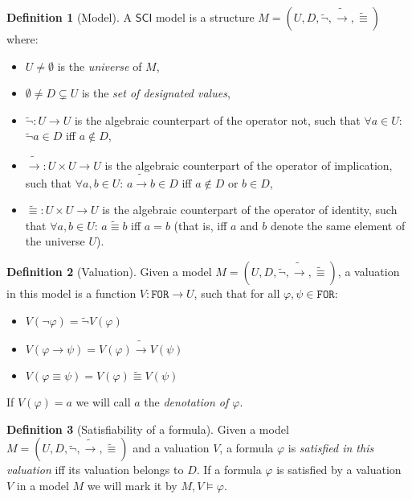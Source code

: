 \documentclass{article}
\theoremstyle{definition}
\newtheorem{definition}{Definition}[section]
\newcommand*{\id}{\equiv}
\newcommand*{\ra}{\rightarrow}
\newcommand*{\FOR}{\texttt{FOR}}
\newcommand{\SCI}{$\mathsf{SCI}$\xspace}
\begin{document}
\begin{definition}[Model]
    A \SCI model is a structure $M = (U, D, \tilde{\lnot}, \tilde{\ra}, \tilde{\id})$ where:
    \begin{itemize}
        \item $U \not = \emptyset$ is the \emph{universe} of $M$,
        \item $\emptyset \not = D \subsetneq U$ is the \emph{set of designated values},
        \item $\tilde{\lnot}: U \longrightarrow U$ is the algebraic counterpart of the operator not, such that $\forall a \in U$: $\tilde{\lnot}a \in D$ iff $a \not \in D$,
        \item $\tilde{\ra}: U \times U \longrightarrow U$ is the algebraic counterpart of the operator of implication, such that $\forall a, b \in U$: $a \tilde{\ra} b \in D$ iff $a \not \in D$ or $b \in D$,
        \item $\tilde{\id}: U \times U \longrightarrow U$ is the algebraic counterpart of the operator of identity, such that $\forall a, b \in U$: $a \tilde{\id} b$ iff $a = b$ (that is, iff $a$ and $b$ denote the same element of the universe $U$).
    \end{itemize}
\end{definition}

\begin{definition}[Valuation]
    Given a model $M = (U, D, \tilde{\lnot}, \tilde{\ra}, \tilde{\id})$, a valuation in this model is a function $V : \FOR \longrightarrow U$, such that for all $\varphi, \psi \in \FOR$:
    \begin{itemize}
        \item $V(\lnot \varphi) = \tilde{\lnot}V(\varphi)$
        \item $V(\varphi \ra \psi) = V(\varphi) \tilde{\ra} V(\psi)$
        \item $V(\varphi \id \psi) = V(\varphi) \tilde{\id} V(\psi)$
    \end{itemize}
    If $V(\varphi) = a$ we will call $a$ the \emph{denotation of $\varphi$}.
\end{definition}

\begin{definition}[Satisfiability of a formula]
    Given a model $M = (U, D, \tilde{\lnot}, \tilde{\ra}, \tilde{\id})$ and a valuation $V$, a formula $\varphi$ is \emph{satisfied in this valuation} iff its valuation belongs to $D$. If a formula $\varphi$ is satisfied by a valuation $V$ in a model $M$ we will mark it by $M, V \models \varphi$.
\end{definition}
\end{document}

